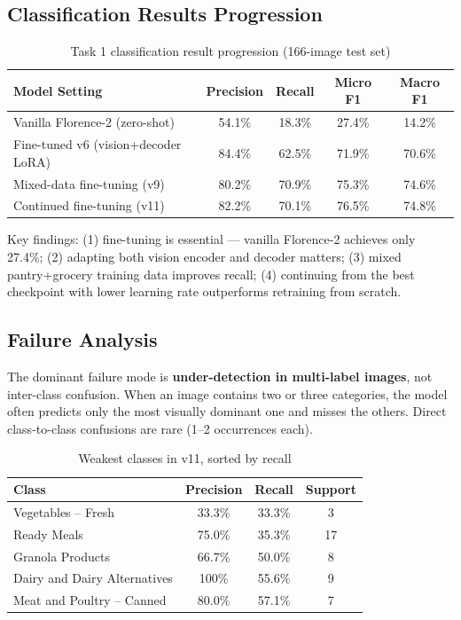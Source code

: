 \documentclass[11pt]{article}
\begin{document}
\subsection{Classification Results Progression}

\begin{table}[h]
\centering
\caption{Task 1 classification result progression (166-image test set)}
\label{tab:progression}
\begin{tabular}{lcccc}
\toprule
Model Setting & Precision & Recall & Micro F1 & Macro F1 \\
\midrule
Vanilla Florence-2 (zero-shot) & 54.1\% & 18.3\% & 27.4\% & 14.2\% \\
Fine-tuned v6 (vision+decoder LoRA) & 84.4\% & 62.5\% & 71.9\% & 70.6\% \\
Mixed-data fine-tuning (v9) & 80.2\% & 70.9\% & 75.3\% & 74.6\% \\
Continued fine-tuning (v11) & 82.2\% & 70.1\% & 76.5\% & 74.8\% \\
\bottomrule
\end{tabular}
\end{table}

Key findings: (1) fine-tuning is essential --- vanilla Florence-2 achieves only 27.4\%; (2) adapting both vision encoder and decoder matters; (3) mixed pantry+grocery training data improves recall; (4) continuing from the best checkpoint with lower learning rate outperforms retraining from scratch.

\subsection{Failure Analysis}

The dominant failure mode is \textbf{under-detection in multi-label images}, not inter-class confusion. When an image contains two or three categories, the model often predicts only the most visually dominant one and misses the others. Direct class-to-class confusions are rare (1--2 occurrences each).

\begin{table}[h]
\centering
\caption{Weakest classes in v11, sorted by recall}
\label{tab:weakclasses}
\begin{tabular}{lccc}
\toprule
Class & Precision & Recall & Support \\
\midrule
Vegetables -- Fresh & 33.3\% & 33.3\% & 3 \\
Ready Meals & 75.0\% & 35.3\% & 17 \\
Granola Products & 66.7\% & 50.0\% & 8 \\
Dairy and Dairy Alternatives & 100\% & 55.6\% & 9 \\
Meat and Poultry -- Canned & 80.0\% & 57.1\% & 7 \\
\bottomrule
\end{tabular}
\end{table}
\end{document}
